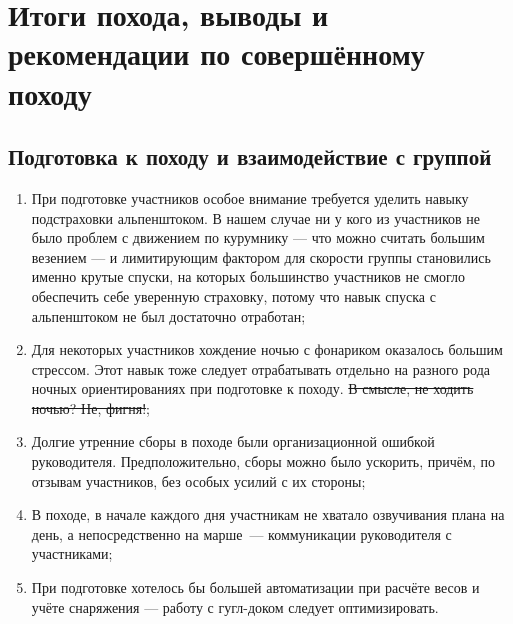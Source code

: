 \section{Итоги похода, выводы и рекомендации по совершённому походу}

\subsection{Подготовка к походу и взаимодействие с группой} 
	\begin{enumerate}
		\item При подготовке участников особое внимание требуется уделить навыку подстраховки альпенштоком. В нашем случае ни у кого из участников не было проблем с движением по курумнику --- что можно считать большим везением --- и лимитирующим фактором для скорости группы становились именно крутые спуски, на которых большинство участников не смогло обеспечить себе уверенную страховку, потому что навык спуска с альпенштоком не был достаточно отработан; 
		\item Для некоторых участников хождение ночью с фонариком оказалось большим стрессом. Этот навык тоже следует отрабатывать отдельно на разного рода ночных ориентированиях при подготовке к походу. \st{В смысле, не ходить ночью? Не, фигня!};
		\item Долгие утренние сборы в походе были организационной ошибкой руководителя. Предположительно, сборы можно было ускорить, причём, по отзывам участников, без особых усилий с их стороны; 
		\item В походе, в начале каждого дня участникам не хватало озвучивания плана на день, а непосредственно на марше~--- коммуникации руководителя с участниками; 
		\item При подготовке хотелось бы большей автоматизации при расчёте весов и учёте снаряжения --- работу с гугл-доком следует оптимизировать.
	\end{enumerate} 
	
